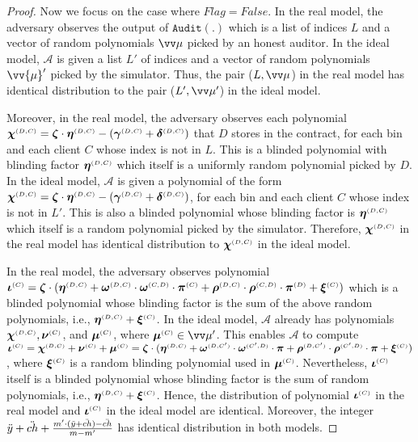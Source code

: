 \begin{proof}
Now we focus on the case where $Flag=False$.  In the real model, the adversary observes the output of $\mathtt{Audit}(.)$ which is a list of indices $  L$ and a vector of random polynomials $\vv\mu$ picked by an honest auditor.  In the ideal model, $\mathcal{A}$ is given a  list $  L'$ of indices and a vector of random polynomials $\vv{\mu}'$ picked by the simulator. Thus, the pair ($  L, \vv\mu$) in the real model has identical distribution to the pair ($  L', \vv\mu'$) in the ideal model. 

Moreover, in the real model, the adversary observes each polynomial $\bm\chi^{ \scriptscriptstyle {  {(D, C)}}}=\bm\zeta\cdot \bm\eta^{ \scriptscriptstyle {  {(D,C)}}}-(\bm\gamma^{ \scriptscriptstyle {  {(D,C)}}}+\bm\delta^{ \scriptscriptstyle {  {(D,C)}}})$ that $D$ stores in the contract, for each bin and each client $C$ whose index is not in $  L$. This is a blinded polynomial with blinding factor $\bm\eta^{ \scriptscriptstyle {  {(D,C)}}}$ which itself is a uniformly random polynomial picked by $D$. In the ideal model, $\mathcal{A}$ is given a polynomial of the form $ {\bm\chi}^{ \scriptscriptstyle {  {(D, C)}}}= {\bm\zeta}\cdot  {\bm\eta}^{ \scriptscriptstyle {  {(D,C)}}}-( {\bm\gamma}^{ \scriptscriptstyle {  {(D,C)}}}+ {\bm\delta}^{ \scriptscriptstyle {  {(D,C)}}})$, for each bin and each client $C$ whose index is not in $  L'$. This is also a blinded polynomial whose blinding factor is  $ {\bm\eta}^{ \scriptscriptstyle {  {(D,C)}}}$ which itself is a random polynomial picked by the simulator.  Therefore, $\bm\chi^{ \scriptscriptstyle {  {(D, C)}}}$ in the real model has  identical distribution to $\bm\chi^{ \scriptscriptstyle {  {(D, C)}}}$ in the ideal model.  

In the real model, the adversary  observes polynomial $ \bm\iota^{ \scriptscriptstyle {  {(C)}}}= \bm\zeta\cdot(\bm\eta^{ \scriptscriptstyle {  {(D,C)}}} + \bm\omega^{ \scriptscriptstyle {  {(D,C)}}}\cdot \bm\omega^{ \scriptscriptstyle {  {(C,D)}}}\cdot \bm\pi^{ \scriptscriptstyle {  {(C)}}}+\bm\rho^{ \scriptscriptstyle {  {(D,C)}}}\cdot \bm\rho^{ \scriptscriptstyle {  {(C,D)}}}\cdot \bm\pi^{ \scriptscriptstyle {  {(D)}}}+\bm\xi^{ \scriptscriptstyle {  {(C)}}})$ which is a blinded polynomial whose blinding factor is the sum of the above random polynomials, i.e., $\bm\eta^{ \scriptscriptstyle {  {(D,C)}}}+\bm\xi^{ \scriptscriptstyle {  {(C)}}}$. In the ideal model, $\mathcal{A}$ already has  polynomials $ {\bm\chi}^{ \scriptscriptstyle {  {(D, C)}}},  {\bm\nu}^{ \scriptscriptstyle {  {(C)}}}$, and $ {\bm\mu}^{ \scriptscriptstyle {  {(C)}}}$, where $ {\bm\mu}^{ \st {  {(C)}}}\in {\vv \mu'}$. This enables $\mathcal{A}$ to compute
 $  {\bm\iota}^{ \scriptscriptstyle {  {(C)}}} =  {\bm\chi}^{ \scriptscriptstyle {  {(D, C)}}} +   {\bm\nu}^{ \scriptscriptstyle {  {(C)}}} +  {\bm\mu}^{ \scriptscriptstyle {  {(C)}}}= {\bm\zeta}\cdot ( {\bm\eta}^{ \scriptscriptstyle {  {(D,C)}}}+  {\bm\omega}^{ \scriptscriptstyle {  {(D,C')}}}\cdot  {\bm\omega}^{ \scriptscriptstyle {  {(C',D)}}}\cdot  {\bm\pi}+  {\bm\rho}^{ \scriptscriptstyle {  {(D,C')}}}\cdot  {\bm\rho}^{ \scriptscriptstyle {  {(C',D)}}}\cdot  {\bm\pi}+ {\bm\xi}^{ \scriptscriptstyle {  {(C)}}})$,
  where $ {\bm\xi}^{ \scriptscriptstyle {  {(C)}}}$ is a random blinding polynomial used in $ {\bm\mu}^{ \scriptscriptstyle {  {(C)}}}$. Nevertheless, $ {\bm\iota}^{ \scriptscriptstyle {  {(C)}}}$ itself is a blinded polynomial whose blinding factor is the sum of random polynomials, i.e., $ {\bm\eta}^{ \scriptscriptstyle {  {(D,C)}}}+ {\bm\xi}^{ \scriptscriptstyle {  {(C)}}}$. Hence, the distribution of polynomial $ \bm\iota^{ \scriptscriptstyle {  {(C)}}}$ in the real model and $ {\bm\iota}^{ \scriptscriptstyle {  {(C)}}}$ in the ideal model are identical. Moreover, the integer $\ddot{y}+\ddot{ch}+\frac{m'\cdot (\ddot{y}+\ddot{ch})-\ddot{ch}}{m-m'}$ has identical distribution  in both  models. 


\end{proof}
